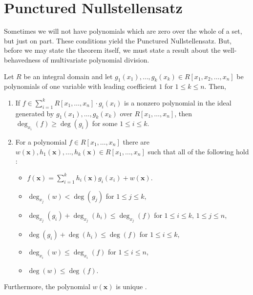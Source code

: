 \section*{Punctured Nullstellensatz}
Sometimes we will not have polynomials which are zero over the whole of a set, but just on part. These conditions yield the Punctured Nullstellensatz. But, before we may state the theorem itself, we must state a result about the well-behavedness of multivariate polynomial division.
\begin{lemma} Let $R$ be an integral domain
	and let $g_{1} \left( x_{1} \right), \ldots, g_{k} \left( x_{k} \right)
	\in R[x_1, x_2, \ldots, x_{n}] $ be polynomials of one variable with
	leading coefficient $1$ for $1 \le k \le n$. Then,
\begin{enumerate}
	\item If \(f \in \sum_{i= 1}^{k} R\left[ x_1, \ldots, x_{n} \right] \cdot g_{i}\left( x_{i} \right)  \) is a nonzero polynomial in the ideal generated by \(g_1 \left( x_1 \right) , \ldots, g_{k} \left( x_{k} \right) \) over \(R\left[ x_1, \ldots, x_{n} \right] \), then \(\deg _{x_{i}} \left(  f \right)\ge \deg \left( g_{i} \right)  \) for some \(1 \le i \le k\).
	\item For a polynomial \(f \in R\left[ x_1, \ldots, x_{n} \right] \) there are \\\(w\left( \textbf{x} \right) , h_1\left( \textbf{x} \right) , \ldots, h_{k}\left( \textbf{x} \right)  \in R \left[ x_1, \ldots, x_{n} \right] \) such that all of the following hold :
		\begin{itemize}
			\item \(f\left( \textbf{x}  \right) = \sum_{i= 1}^{k} h_{i}\left( \textbf{x} \right)  g_{i}\left( x_{i} \right) + w\left( \textbf{x} \right)  \).
				\item \(\deg _{x_{j}} \left(w \right) < \deg \left( g_{j} \right)  \) for \(1 \le j \le k\),
					\item \(\deg _{x_{j}} \left(g_{i} \right) + \deg _{x_{j}} \left(h_{i} \right) \le \deg _{x_{j}} \left(  f \right)   \) for \(1 \le i \le k\), \(1 \le j \le n\),
						\item \(\deg \left( g_{i} \right) + \deg \left( h_{i} \right) \le \deg \left( f \right)   \) for \(1 \le i \le k\),
							\item \(\deg _{x_{i}} \left(w \right) \le \deg _{x_{i}} \left(  f \right)  \) for \(1 \le i \le n\),
								\item \(\deg \left( w \right)  \le \deg \left( f \right) \).
		\end{itemize}
\end{enumerate}
Furthermore, the polynomial $w\left( \textbf{x} \right) $ is unique
.\end{lemma}
